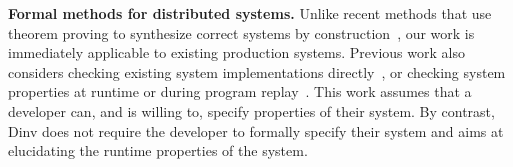 \textbf{Formal methods for distributed systems.}  %
%
Unlike recent methods that use theorem proving to synthesize correct
systems by construction~\cite{wilcox_verdi_pldi15,
  hawblitzel_ironfleet_sosp2015}, our work is immediately applicable
to existing production systems. %
%
Previous work also considers checking existing system implementations
directly~\cite{yang_modist_nsdi09, killian_macemc_nsdi_2007}, or
checking system properties at runtime or during program
replay~\cite{reynolds_pip_2006,
  geels_friday_nsdi_2007,liu_d3s_nsdi_2008,VeriFlow}.  This work
assumes that a developer can, and is willing to, specify properties of
their system. By contrast, Dinv does not require the developer to
formally specify their system and aims at elucidating the runtime
properties of the system.



